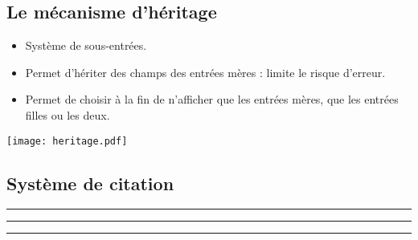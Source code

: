 \subsection{Le mécanisme d'héritage}

\begin{slide}
  \begin{itemize}
    \item Système de sous-entrées.
    \item Permet d'hériter des champs des entrées mères : limite le risque d'erreur.
    \item Permet de choisir à la fin de n'afficher que les entrées mères, que les entrées filles ou les deux.
\end{itemize}
\end{slide}

\begin{slide}
 \centering
 \texttt{[image: heritage.pdf]}

 \cite{Maraval1998}
\end{slide}

\subsection{Système de citation}

\begin{slide}
  \beamerdefaultoverlayspecification{} 

  \cite{BHG226}
  \hrule


  \cite[(3)630]{Pleiade_Barnabe}

  \hrule
  


  \cite[(1)629]{Pleiade_Barnabe}
  

  \hrule


  \cite{BHG226}

\end{slide}
